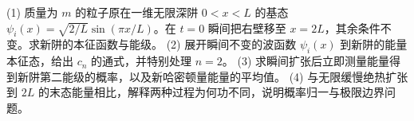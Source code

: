 (1) 质量为 \(m\) 的粒子原在一维无限深阱 \(0<x<L\) 的基态 \(\psi_i(x)=\sqrt{2/L}\sin(\pi x/L)\)。在 \(t=0\) 瞬间把右壁移至 \(x=2L\)，其余条件不变。求新阱的本征函数与能级。
(2) 展开瞬间不变的波函数 \(\psi_i(x)\) 到新阱的能量本征态，给出 \(c_n\) 的通式，并特别处理 \(n=2\)。
(3) 求瞬间扩张后立即测量能量得到新阱第二能级的概率，以及新哈密顿量能量的平均值。
(4) 与无限缓慢绝热扩张到 \(2L\) 的末态能量相比，解释两种过程为何功不同，说明概率归一与极限边界问题。

